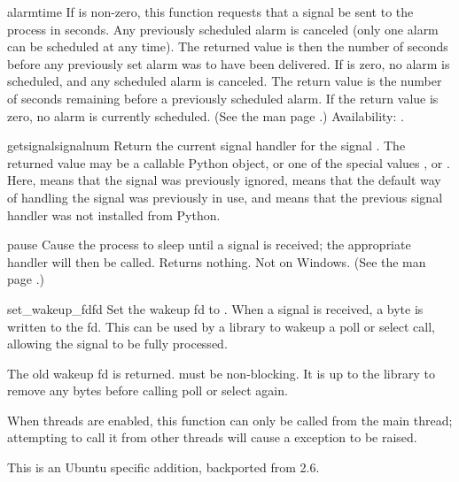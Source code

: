 \begin{funcdesc}{alarm}{time}
  If  is non-zero, this function requests that a
   signal be sent to the process in  seconds.
  Any previously scheduled alarm is canceled (only one alarm can
  be scheduled at any time).  The returned value is then the number of
  seconds before any previously set alarm was to have been delivered.
  If  is zero, no alarm is scheduled, and any scheduled
  alarm is canceled.  The return value is the number of seconds
  remaining before a previously scheduled alarm.  If the return value
  is zero, no alarm is currently scheduled.  (See the \UNIX{} man page
  .)
  Availability: \UNIX.
\end{funcdesc}

\begin{funcdesc}{getsignal}{signalnum}
  Return the current signal handler for the signal .
  The returned value may be a callable Python object, or one of the
  special values ,  or
  .  Here,  means that the
  signal was previously ignored,  means that the
  default way of handling the signal was previously in use, and
   means that the previous signal handler was not installed
  from Python.
\end{funcdesc}

\begin{funcdesc}{pause}{}
  Cause the process to sleep until a signal is received; the
  appropriate handler will then be called.  Returns nothing.  Not on
  Windows. (See the \UNIX{} man page .)
\end{funcdesc}

\begin{funcdesc}{set_wakeup_fd}{fd}
  Set the wakeup fd to .  When a signal is received, a
   byte is written to the fd.  This can be used by a library
  to wakeup a poll or select call, allowing the signal to be fully
  processed.

  The old wakeup fd is returned.   must be non-blocking.  It
  is up to the library to remove any bytes before calling poll or
  select again.

  When threads are enabled, this function can only be called from the
  main thread; attempting to call it from other threads will cause a
   exception to be raised.

  This is an Ubuntu specific addition, backported from 2.6.
\end{funcdesc}

